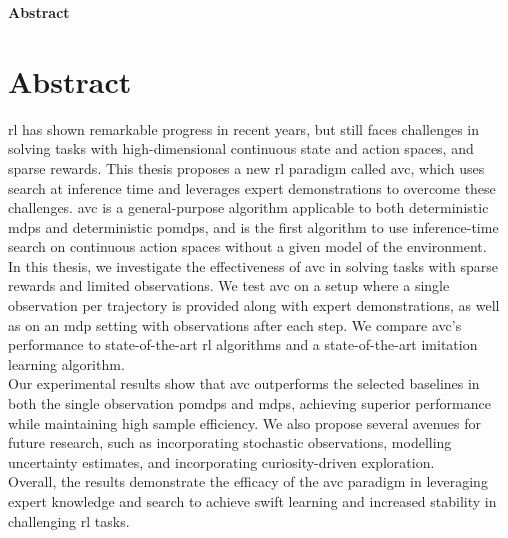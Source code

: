 \clearemptydoublepage
{}
{}

\vspace*{2cm}
\begin{center}
{\Large \textbf{Abstract}}
\end{center}
\vspace{1cm}

\chapter*{Abstract}
\label{chapter:Abstract}

\ac{rl} has shown remarkable progress in recent years, but still faces challenges in solving tasks with high-dimensional 
continuous state and action spaces, and sparse rewards. This thesis proposes a new \ac{rl} paradigm called \ac{avc}, which uses search at 
inference time and leverages expert demonstrations to overcome these challenges. \ac{avc} is a general-purpose algorithm applicable to both deterministic 
\ac{mdp}s and deterministic \ac{pomdp}s, and is the first algorithm to use inference-time search on continuous 
action spaces without a given model of the environment.\\

In this thesis, we investigate the effectiveness of \ac{avc} in solving tasks with sparse rewards and limited observations. We test \ac{avc} on 
a setup where a single observation per trajectory is provided along with expert demonstrations, as well as on an \ac{mdp} setting with observations 
after each step. We compare \ac{avc}'s performance to state-of-the-art \ac{rl} algorithms and a state-of-the-art imitation 
learning algorithm. \\

Our experimental results show that \ac{avc} outperforms the selected baselines in both the single observation \ac{pomdp}s and \ac{mdp}s, achieving superior 
performance while maintaining high sample efficiency. We also propose several avenues for future research, such as incorporating stochastic 
observations, modelling uncertainty estimates, and incorporating curiosity-driven exploration.\\

Overall, the results demonstrate the efficacy of the \ac{avc} paradigm in leveraging expert knowledge and search to achieve swift learning and 
increased stability in challenging \ac{rl} tasks.